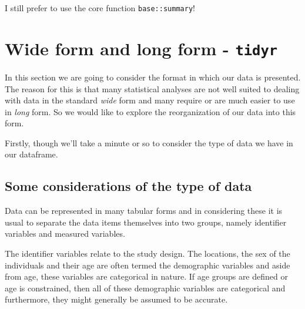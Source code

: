 \documentclass[titlepage]{book}\usepackage{knitr}
\begin{document}
\begin{knitrout}
\color{fgcolor}
\end{knitrout}

I still prefer to use the core function \texttt{base::summary}!

\section{Wide form and long form - \texttt{tidyr}}

In this section we are going to consider the format in which our data is presented.  The reason for this is that many statistical analyses are not well suited to dealing with data in the standard \textsl{wide} form and many require or are much easier to use in \textsl{long} form. So we would like to explore the reorganization of our data into this form. 

Firstly, though we'll take a minute or so to consider the type of data we have in our dataframe.

\subsection{Some considerations of the type of data}

Data can be represented in many tabular forms and in considering these it is usual to separate the data items themselves into two groups, namely identifier variables and measured variables. 

The identifier variables relate to the study design. The locations, the sex of the individuals and their age are often termed the demographic variables and aside from age, these variables are categorical in nature.  If age groups are defined or age is constrained, then all of these demographic variables are categorical and furthermore, they might generally be assumed to be accurate.   
\end{document}
